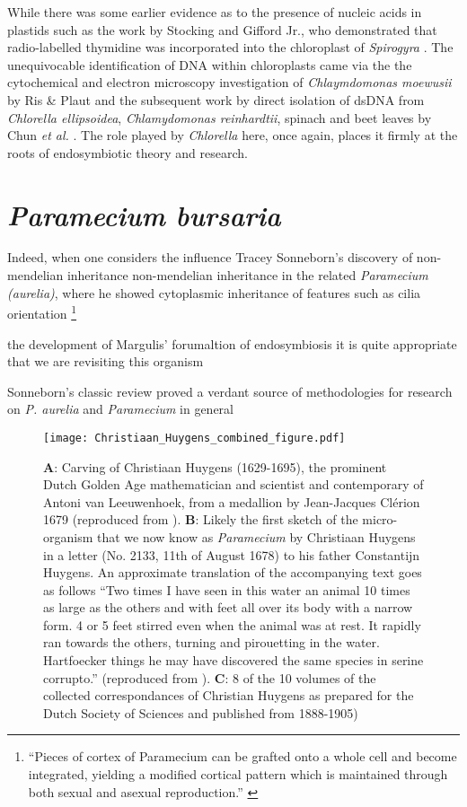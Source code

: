 While there was some earlier evidence as to the presence of nucleic acids in 
plastids such as the work by Stocking and Gifford Jr., who demonstrated that
radio-labelled thymidine was incorporated into the chloroplast of \textit{Spirogyra}
\citep{Stocking1959}.
The unequivocable identification of DNA within chloroplasts came via the 
the cytochemical and electron microscopy investigation of \textit{Chlaymdomonas moewusii} 
by Ris \& Plaut \citep{Ris1962} and the subsequent work by direct isolation of
dsDNA from \textit{Chlorella ellipsoidea}, \textit{Chlamydomonas reinhardtii}, spinach
and beet leaves by Chun \textit{et al.} \citep{Chun1963}. The role played by
\textit{Chlorella} here, once again, places it firmly at the roots of endosymbiotic
theory and research.



\section{\textit{Paramecium bursaria}}

\citep{Corliss1974} 




Indeed, when one considers the influence Tracey Sonneborn's discovery of non-mendelian
inheritance non-mendelian inheritance in the related \textit{Paramecium (aurelia)}, where he showed
cytoplasmic inheritance of features such as cilia orientation \footnote{``Pieces of cortex of Paramecium can be grafted onto a whole cell and
    become integrated, yielding a modified cortical pattern which is maintained through both sexual and asexual reproduction.'' \citep{Beisson1965}}

the development of Margulis' forumaltion of endosymbiosis \citep{Margulis1998} it is
quite appropriate that we are revisiting this organism

Sonneborn's classic review \citep{Sonneborn1950} proved a verdant source of methodologies
for research on  \textit{P. aurelia} and \textit{Paramecium} in general

\begin{figure}[h!]
    \caption{\textbf{A}: Carving of Christiaan Huygens (1629-1695), the prominent Dutch Golden Age mathematician and scientist and contemporary of Antoni van Leeuwenhoek, from a medallion by Jean-Jacques Cl\'erion 1679 (reproduced from \citep{Huygens}). \textbf{B}: Likely the first sketch of the micro-organism that we now know as \textit{Paramecium} by Christiaan Huygens in a letter (No. 2133, 11th of August 1678) to his father Constantijn Huygens. An approximate translation of the accompanying text goes as follows ``Two times I have seen in this water an animal 10 times as large as the others and with feet all over its body with a narrow form.  4 or 5 feet stirred even when the animal was at rest. It rapidly ran towards the others, turning and pirouetting in the water. Hartfoecker things he may have discovered the same species in serine corrupto.'' (reproduced from \citep{Huygens}). \textbf{C}: 8 of the 10 volumes of the collected correspondances of Christian Huygens as prepared for the Dutch Society of Sciences and published from 1888-1905)}
\texttt{[image: Christiaan\_Huygens\_combined\_figure.pdf]}
\end{figure}


